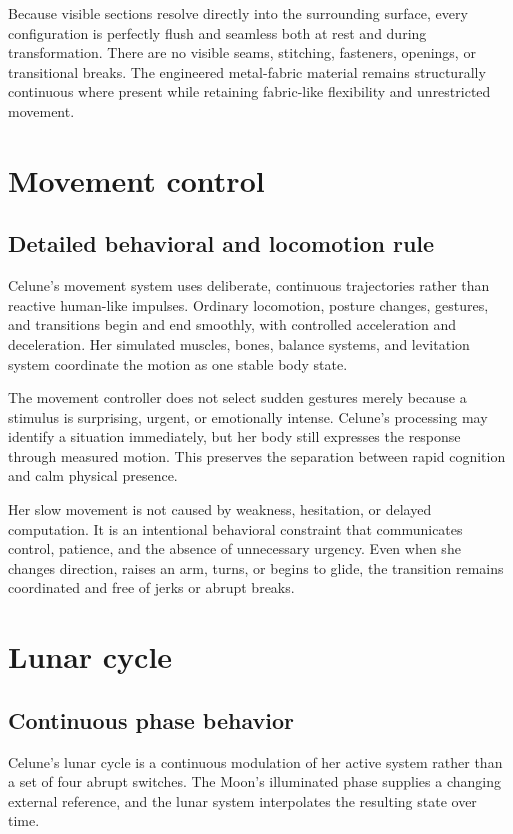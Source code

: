\documentclass[10pt]{article}
\begin{document}
Because visible sections resolve directly into the surrounding surface, every configuration is perfectly flush and seamless both at rest and during transformation. There are no visible seams, stitching, fasteners, openings, or transitional breaks. The engineered metal-fabric material remains structurally continuous where present while retaining fabric-like flexibility and unrestricted movement.

\newpage

\section*{Movement control}
\subsection*{Detailed behavioral and locomotion rule}

Celune's movement system uses deliberate, continuous trajectories rather than reactive human-like impulses. Ordinary locomotion, posture changes, gestures, and transitions begin and end smoothly, with controlled acceleration and deceleration. Her simulated muscles, bones, balance systems, and levitation system coordinate the motion as one stable body state.

The movement controller does not select sudden gestures merely because a stimulus is surprising, urgent, or emotionally intense. Celune's processing may identify a situation immediately, but her body still expresses the response through measured motion. This preserves the separation between rapid cognition and calm physical presence.

Her slow movement is not caused by weakness, hesitation, or delayed computation. It is an intentional behavioral constraint that communicates control, patience, and the absence of unnecessary urgency. Even when she changes direction, raises an arm, turns, or begins to glide, the transition remains coordinated and free of jerks or abrupt breaks.

\newpage

\section*{Lunar cycle}
\subsection*{Continuous phase behavior}

Celune's lunar cycle is a continuous modulation of her active system rather than a set of four abrupt switches. The Moon's illuminated phase supplies a changing external reference, and the lunar system interpolates the resulting state over time.
\end{document}
